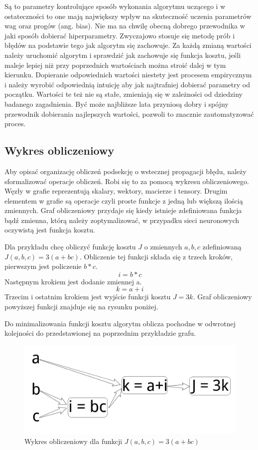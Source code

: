 \documentclass[12pt,a4paper,twoside,titlepage,openright]{book}
\begin{document}
Są to parametry kontrolujące sposób wykonania algorytmu uczącego i w ostateczności to one mają największy wpływ na skuteczność uczenia parametrów wag oraz progów (ang. bias). Nie ma na chwilę obecną dobrego przewodnika w jaki sposób dobierać hiperparametry. Zwyczajowo stosuje się metodę prób i błędów na podstawie tego jak algorytm się zachowuje. \cite{sitefastAI} Za każdą zmianą wartości należy uruchomić algorytm i sprawdzić jak zachowuje się funkcja kosztu, jeśli maleje lepiej niż przy poprzednich wartościach można stroić dalej w tym kierunku. Dopieranie odpowiednich wartości niestety jest procesem empirycznym i należy wyrobić odpowiednią intuicję aby jak najtrafniej dobierać parametry od początku. Wartości te też nie są stałe, zmieniają się w zależności od dziedziny badanego zagadnienia. Być może najbliższe lata przyniosą dobry i spójny przewodnik dobierania najlepszych wartości, pozwoli to znacznie zautomatyzować proces.

\subsection{Wykres obliczeniowy}
Aby opisać organizację obliczeń podsekcję o wstecznej propagacji błędu, należy sformalizować operacje obliczeń. Robi się to za pomocą wykresu obliczeniowego. Węzły w grafie reprezentują skalary, wektory, macierze i tensory. Drugim elementem w grafie są operacje czyli proste funkcje z jedną lub większą ilością zmiennych. Graf obliczeniowy przydaje się kiedy istnieje zdefiniowana funkcja bądź zmienna, którą należy zoptymalizować, w przypadku sieci neuronowych oczywistą jest funkcja kosztu.

Dla przykładu chcę obliczyć funkcję kosztu \(J\) o zmiennych \(a,b,c\) zdefiniowaną \(J(a,b,c) = 3(a+bc)\). Obliczenie tej funkcji składa się z trzech kroków, pierwszym jest policzenie \(b*c\).
$$i = b * c$$
Następnym krokiem jest dodanie zmiennej a.
$$k = a + i$$
Trzecim i ostatnim krokiem jest wyjście funkcji kosztu \(J = 3k\).
Graf obliczeniowy powyższej funkcji znajduje się na rysunku poniżej.

Do minimalizowania funkcji kosztu algorytm oblicza pochodne w odwrotnej kolejności do przedstawionej na poprzednim przykładzie grafu.

\begin{figure}[ht]
	\centering
			\includegraphics[resolution=100, scale=0.4]{ComputationGraph.png}
		\caption{Wykres obliczeniowy dla funkcji \(J(a,b,c) = 3(a+bc)\)}
\end{figure}
\end{document}
